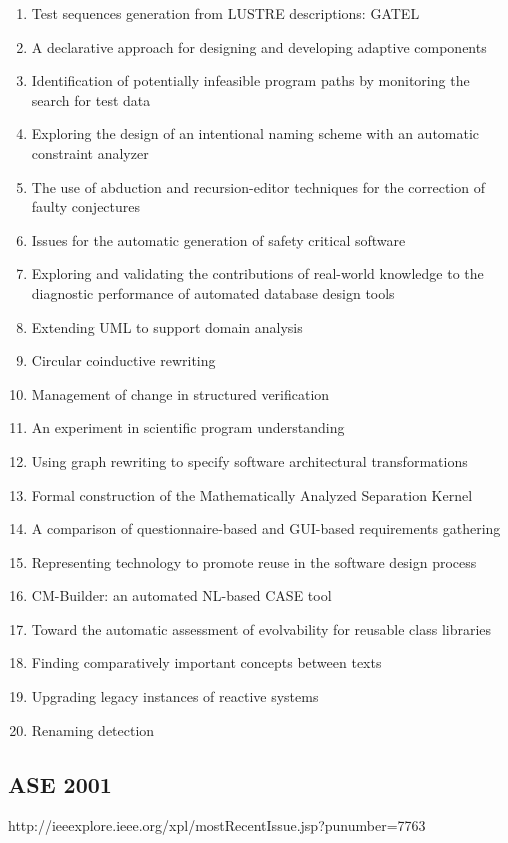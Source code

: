 \begin{enumerate}[itemsep=-1ex]
  \item Test sequences generation from LUSTRE descriptions: GATEL
  \item A declarative approach for designing and developing adaptive components
  \item Identification of potentially infeasible program paths by monitoring the search for test data
  \item Exploring the design of an intentional naming scheme with an automatic constraint analyzer
  \item The use of abduction and recursion-editor techniques for the correction of faulty conjectures
  \item Issues for the automatic generation of safety critical software
  \item Exploring and validating the contributions of real-world knowledge to the diagnostic performance of automated database design tools
  \item Extending UML to support domain analysis
  \item Circular coinductive rewriting
  \item Management of change in structured verification
  \item An experiment in scientific program understanding
  \item Using graph rewriting to specify software architectural transformations
  \item Formal construction of the Mathematically Analyzed Separation Kernel
  \item A comparison of questionnaire-based and GUI-based requirements gathering
  \item Representing technology to promote reuse in the software design process
  \item CM-Builder: an automated NL-based CASE tool
  \item Toward the automatic assessment of evolvability for reusable class libraries
  \item Finding comparatively important concepts between texts
  \item Upgrading legacy instances of reactive systems
  \item Renaming detection 
\end{enumerate}

\subsection{ASE 2001}

http://ieeexplore.ieee.org/xpl/mostRecentIssue.jsp?punumber=7763

